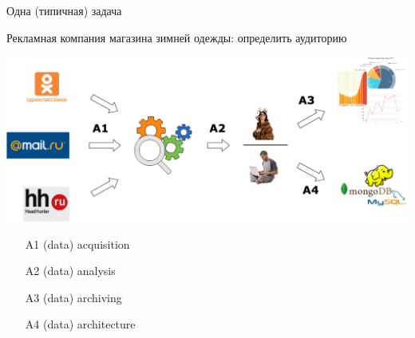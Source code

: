 \documentclass[10pt,a4paper]{beamer}
\begin{document}
\begin{frame}{Одна (типичная) задача}

{\small Рекламная компания магазина зимней одежды: определить аудиторию}

\begin{center}
\includegraphics[scale=0.25]{images/furcoats.png}
\end{center}

\begin{itemize}
\item[A1] (data) acquisition
\item[A2] (data) analysis
\item[A3] (data) archiving
\item[A4] (data) architecture
\end{itemize}

\end{frame}

\end{document}
